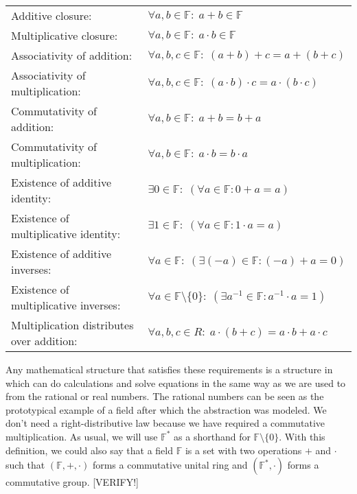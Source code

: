 \medskip
\begin{tabular}{l l}
Additive closure: 
& $\forall a,b \in \mathbb{F}: \; a + b \in \mathbb{F}$  \\	
Multiplicative closure: 
& $\forall a,b \in \mathbb{F}: \; a \cdot b \in \mathbb{F}$  \\	
Associativity of addition: 
& $\forall a,b,c \in \mathbb{F}: \;  (a + b) + c = a + (b + c)$   \\
Associativity of multiplication: 
& $\forall a,b,c \in \mathbb{F}: \;  (a \cdot b) \cdot c = a \cdot (b \cdot c)$   \\
Commutativity of addition: 
& $\forall a,b \in \mathbb{F}: \;  a + b = b + a$   \\
Commutativity of multiplication: 
& $\forall a,b \in \mathbb{F}: \;  a \cdot b = b \cdot a$   \\
Existence of additive identity: 
& $\exists 0 \in \mathbb{F}: \; (\forall a \in \mathbb{F}: 0 + a = a)$ \\
Existence of multiplicative identity: 
& $\exists 1 \in \mathbb{F}: \; (\forall a \in \mathbb{F}: 1 \cdot a = a)$ \\
Existence of additive inverses: 
& $\forall a \in \mathbb{F}: \; (\exists (-a) \in \mathbb{F}: (-a) + a = 0 )$ \\
Existence of multiplicative inverses: 
& $\forall a \in \mathbb{F} \setminus \{0\}: \; (\exists a^{-1} \in \mathbb{F}: a^{-1} \cdot a = 1 )$ \\
Multiplication distributes over addition: 
& $\forall a,b,c \in R: \;  a \cdot (b + c) = a \cdot b + a \cdot c$
\end{tabular}


Any mathematical structure that satisfies these requirements is a structure in which can do calculations and solve equations in the same way as we are used to from the rational or real numbers. The rational numbers can be seen as the prototypical example of a field after which the abstraction was modeled. We don't need a right-distributive law because we have required a commutative multiplication. As usual, we will use $\mathbb{F}^*$ as a shorthand for $\mathbb{F} \setminus \{0\}$. With this definition, we could also say that a field $\mathbb{F}$ is a set with two operations $+$ and $\cdot$ such that $(\mathbb{F},+,\cdot)$ forms a commutative unital ring and  $(\mathbb{F}^*,\cdot)$ forms a commutative group. [VERIFY!] 


